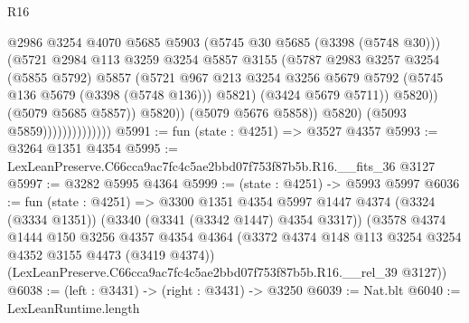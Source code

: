 \begin{lexlean}{R16}
\begin{coremodule}
                                          @2986
                                          @3254
                                          @4070
                                          @5685
                                          @5903
                                          (@5745 @30 @5685 (@3398 (@5748 @30)))
                                          (@5721
                                            @2984
                                            @113
                                            @3259
                                            @3254
                                            @5857
                                            @3155
                                            (@5787
                                              @2983
                                              @3257
                                              @3254
                                              (@5855 @5792)
                                              @5857
                                              (@5721
                                                @967
                                                @213
                                                @3254
                                                @3256
                                                @5679
                                                @5792
                                                (@5745 @136 @5679 (@3398 (@5748 @136)))
                                                @5821)
                                              (@3424 @5679 @5711))
                                            @5820))
                                        (@5079 @5685 @5857))
                                      @5820))
                                  (@5079 @5676 @5858))
                                @5820)
                              (@5093 @5859))))))))))))))
@5991 := fun (state : @4251) => @3527 @4357
@5993 := @3264 @1351 @4354
@5995 := LexLeanPreserve.C66cca9ac7fc4c5ae2bbd07f753f87b5b.R16.__fits_36 @3127
@5997 := @3282 @5995 @4364
@5999 := (state : @4251) -> @5993 @5997
@6036 := fun (state : @4251) =>
  @3300
    @1351
    @4354
    @5997
    @1447
    @4374
    (@3324 (@3334 @1351))
    (@3340 (@3341 (@3342 @1447) @4354 @3317))
    (@3578
      @4374
      @1444
      @150
      @3256
      @4357
      @4354
      @4364
      (@3372 @4374 @148 @113 @3254 @3254 @4352 @3155 @4473 (@3419 @4374))
      (LexLeanPreserve.C66cca9ac7fc4c5ae2bbd07f753f87b5b.R16.__rel_39 @3127))
@6038 := (left : @3431) -> (right : @3431) -> @3250
@6039 := Nat.blt
@6040 := LexLeanRuntime.length

\end{coremodule}
\end{lexlean}
